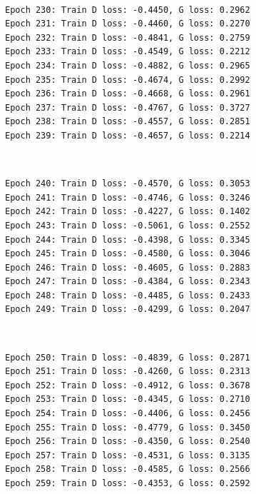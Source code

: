 \documentclass[11pt]{article}
\begin{document}
    \begin{center}
    \end{center}
    { \hspace*{\fill} \\}
    
    \begin{Verbatim}[commandchars=\\\{\}]
Epoch 230: Train D loss: -0.4450, G loss: 0.2962
Epoch 231: Train D loss: -0.4460, G loss: 0.2270
Epoch 232: Train D loss: -0.4841, G loss: 0.2759
Epoch 233: Train D loss: -0.4549, G loss: 0.2212
Epoch 234: Train D loss: -0.4882, G loss: 0.2965
Epoch 235: Train D loss: -0.4674, G loss: 0.2992
Epoch 236: Train D loss: -0.4668, G loss: 0.2961
Epoch 237: Train D loss: -0.4767, G loss: 0.3727
Epoch 238: Train D loss: -0.4557, G loss: 0.2851
Epoch 239: Train D loss: -0.4657, G loss: 0.2214

    \end{Verbatim}

    \begin{center}
    \end{center}
    { \hspace*{\fill} \\}
    
    \begin{Verbatim}[commandchars=\\\{\}]
Epoch 240: Train D loss: -0.4570, G loss: 0.3053
Epoch 241: Train D loss: -0.4746, G loss: 0.3246
Epoch 242: Train D loss: -0.4227, G loss: 0.1402
Epoch 243: Train D loss: -0.5061, G loss: 0.2552
Epoch 244: Train D loss: -0.4398, G loss: 0.3345
Epoch 245: Train D loss: -0.4580, G loss: 0.3046
Epoch 246: Train D loss: -0.4605, G loss: 0.2883
Epoch 247: Train D loss: -0.4384, G loss: 0.2343
Epoch 248: Train D loss: -0.4485, G loss: 0.2433
Epoch 249: Train D loss: -0.4299, G loss: 0.2047

    \end{Verbatim}

    \begin{center}
    \end{center}
    { \hspace*{\fill} \\}
    
    \begin{Verbatim}[commandchars=\\\{\}]
Epoch 250: Train D loss: -0.4839, G loss: 0.2871
Epoch 251: Train D loss: -0.4260, G loss: 0.2313
Epoch 252: Train D loss: -0.4912, G loss: 0.3678
Epoch 253: Train D loss: -0.4345, G loss: 0.2710
Epoch 254: Train D loss: -0.4406, G loss: 0.2456
Epoch 255: Train D loss: -0.4779, G loss: 0.3450
Epoch 256: Train D loss: -0.4350, G loss: 0.2540
Epoch 257: Train D loss: -0.4531, G loss: 0.3135
Epoch 258: Train D loss: -0.4585, G loss: 0.2566
Epoch 259: Train D loss: -0.4353, G loss: 0.2592

    \end{Verbatim}
\end{document}
